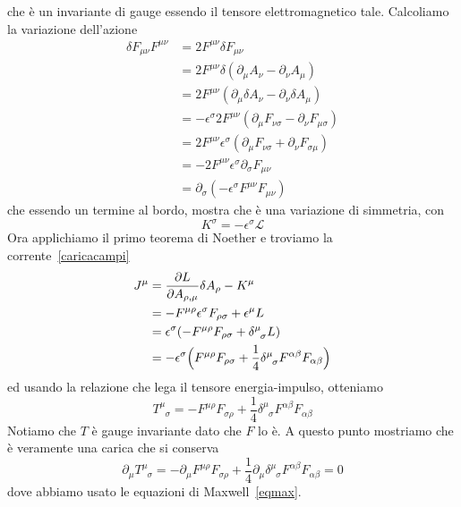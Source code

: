     che è un invariante di gauge essendo il tensore elettromagnetico tale. Calcoliamo la variazione dell'azione
\begin{equation*}
\begin{aligned}
    \delta F_{\mu\nu} F^{\mu\nu} & = 2 F^{\mu\nu} \delta F_{\mu\nu} \\ &= 2 F^{\mu\nu} \delta (\partial_\mu A_\nu - \partial_\nu A_\mu) \\ & = 2 F^{\mu\nu} (\partial_\mu \delta A_\nu - \partial_\nu \delta A_\mu) \\ & = - \epsilon^\sigma 2 F^{\mu\nu} (\partial_\mu F_{\nu\sigma}  - \partial_\nu F_{\mu\sigma}) \\ & = 2 F^{\mu\nu} \epsilon^\sigma (\partial_\mu F_{\nu\sigma} + \partial_\nu F_{\sigma\mu}) \\ & = - 2 F^{\mu\nu} \epsilon^\sigma \partial_\sigma F_{\mu\nu} \\ & = \partial_\sigma (-\epsilon^\sigma F^{\mu\nu} F_{\mu\nu})
\end{aligned}
\end{equation*}
    che essendo un termine al bordo, mostra che è una variazione di simmetria, con 
\begin{equation*}
    K^\sigma = -\epsilon^\sigma \mathcal L
\end{equation*}
    Ora applichiamo il primo teorema di Noether e troviamo la corrente~\eqref{caricacampi} 
\begin{equation*}
\begin{aligned}
    J^\mu & = \pdv{L}{A_{\rho,\mu}} \delta A_\rho - K^\mu \\ & = - F^{\mu\rho} \epsilon^\sigma F_{\rho\sigma} + \epsilon^\mu L \\ & = \epsilon^\sigma (- F^{\mu\rho} F_{\rho \sigma} + \delta^\mu_{\phantom \mu \sigma} L ) \\ & = - \epsilon^\sigma \Big ( F^{\mu\rho} F_{\rho\sigma} + \frac{1}{4} \delta^\mu_{\phantom \mu \sigma} F^{\alpha \beta} F_{\alpha \beta} \Big)
\end{aligned}
\end{equation*}
    ed usando la relazione che lega il tensore energia-impulso, otteniamo 
\begin{equation*}
    T^\mu_{\phantom \mu \sigma} = - F^{\mu\rho} F_{\sigma\rho} + \frac{1}{4} \delta^\mu_{\phantom \mu \sigma} F^{\alpha \beta} F_{\alpha \beta}
\end{equation*}
    Notiamo che $T$ è gauge invariante dato che $F$ lo è. A questo punto mostriamo che è veramente una carica che si conserva
\begin{equation*}
    \partial_\mu T^\mu_{\phantom \mu \sigma} = - \partial_\mu F^{\mu\rho} F_{\sigma\rho} + \frac{1}{4} \partial_\mu \delta^\mu_{\phantom \mu \sigma} F^{\alpha \beta} F_{\alpha \beta} = 0
\end{equation*} 
    dove abbiamo usato le equazioni di Maxwell~\eqref{eqmax}.

